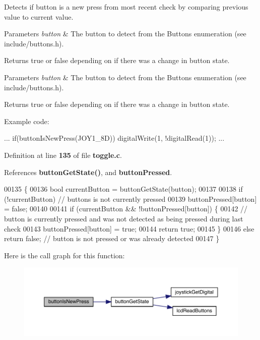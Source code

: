Detects if button is a new press from most recent check by comparing previous value to current value. 


\begin{DoxyParams}{Parameters}
{\em button} & The button to detect from the Buttons enumeration (see include/buttons.\+h).\\
\hline
\end{DoxyParams}
\begin{DoxyReturn}{Returns}
true or false depending on if there was a change in button state.
\end{DoxyReturn}

\begin{DoxyParams}{Parameters}
{\em button} & The button to detect from the Buttons enumeration (see include/buttons.\+h).\\
\hline
\end{DoxyParams}
\begin{DoxyReturn}{Returns}
true or false depending on if there was a change in button state.
\end{DoxyReturn}
Example code\+: 
\begin{DoxyCode}
...
if(buttonIsNewPress(JOY1_8D))
    digitalWrite(1, !digitalRead(1));
...
\end{DoxyCode}
 

Definition at line \textbf{ 135} of file \textbf{ toggle.\+c}.



References \textbf{ button\+Get\+State()}, and \textbf{ button\+Pressed}.


\begin{DoxyCode}
00135                                        \{
00136     \textcolor{keywordtype}{bool} currentButton = buttonGetState(button);
00137 
00138     \textcolor{keywordflow}{if} (!currentButton) \textcolor{comment}{// buttons is not currently pressed}
00139         buttonPressed[button] = \textcolor{keyword}{false};
00140 
00141     \textcolor{keywordflow}{if} (currentButton && !buttonPressed[button]) \{
00142         \textcolor{comment}{// button is currently pressed and was not detected as being pressed during last check}
00143         buttonPressed[button] = \textcolor{keyword}{true};
00144         \textcolor{keywordflow}{return} \textcolor{keyword}{true};
00145     \}
00146     \textcolor{keywordflow}{else} \textcolor{keywordflow}{return} \textcolor{keyword}{false}; \textcolor{comment}{// button is not pressed or was already detected}
00147 \}
\end{DoxyCode}
Here is the call graph for this function\+:\nopagebreak
\begin{figure}[H]
\begin{center}
\leavevmode
\includegraphics[width=350pt]{toggle_8h_ae819f86fad1b51d66f4294140b53ff77_cgraph}
\end{center}
\end{figure}
